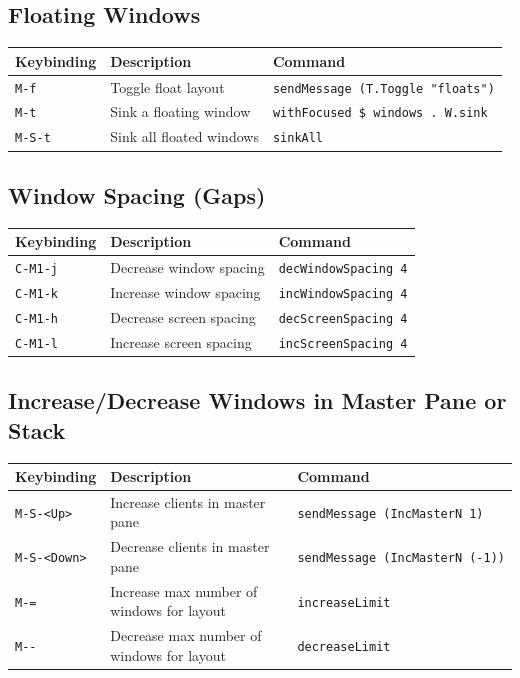 \hypertarget{floating-windows}{%
\subsection{Floating Windows}\label{floating-windows}}

\begin{longtable}[]{@{}lll@{}}
\toprule
Keybinding & Description & Command \\
\midrule
\endhead
\texttt{M-f} & Toggle float layout &
\texttt{sendMessage\ (T.Toggle\ "floats")} \\
\texttt{M-t} & Sink a floating window &
\texttt{withFocused\ \$\ windows\ .\ W.sink} \\
\texttt{M-S-t} & Sink all floated windows & \texttt{sinkAll} \\
\bottomrule
\end{longtable}

\hypertarget{window-spacing-gaps}{%
\subsection{Window Spacing (Gaps)}\label{window-spacing-gaps}}

\begin{longtable}[]{@{}lll@{}}
\toprule
Keybinding & Description & Command \\
\midrule
\endhead
\texttt{C-M1-j} & Decrease window spacing &
\texttt{decWindowSpacing\ 4} \\
\texttt{C-M1-k} & Increase window spacing &
\texttt{incWindowSpacing\ 4} \\
\texttt{C-M1-h} & Decrease screen spacing &
\texttt{decScreenSpacing\ 4} \\
\texttt{C-M1-l} & Increase screen spacing &
\texttt{incScreenSpacing\ 4} \\
\bottomrule
\end{longtable}

\hypertarget{increasedecrease-windows-in-master-pane-or-stack}{%
\subsection{Increase/Decrease Windows in Master Pane or
Stack}\label{increasedecrease-windows-in-master-pane-or-stack}}

\begin{longtable}[]{@{}lll@{}}
\toprule
Keybinding & Description & Command \\
\midrule
\endhead
\texttt{M-S-\textless{}Up\textgreater{}} & Increase clients in master
pane & \texttt{sendMessage\ (IncMasterN\ 1)} \\
\texttt{M-S-\textless{}Down\textgreater{}} & Decrease clients in master
pane & \texttt{sendMessage\ (IncMasterN\ (-1))} \\
\texttt{M-=} & Increase max number of windows for layout &
\texttt{increaseLimit} \\
\texttt{M-\/-} & Decrease max number of windows for layout &
\texttt{decreaseLimit} \\
\bottomrule
\end{longtable}

